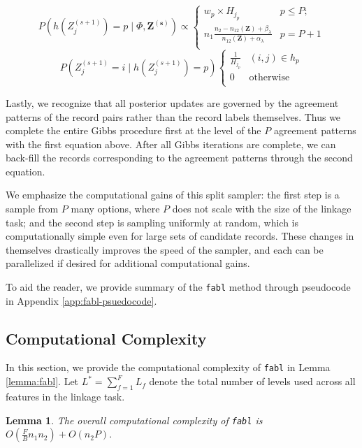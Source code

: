 \documentclass[12pt,letterpaper]{article}
\newcommand{\1}[1]{\mathbb{I}\!\left[#1\right]} %
\newtheorem*{lemma}{Lemma}
\begin{document}
$$P\left(h\left(Z_j^{(s+1)}\right) = p \mid \Phi, \bm{Z^{(s)}}\right) \propto
\begin{cases} 
	w_{p}\times H_{j_p}  & p \leq P; \\
	n_1 \frac{n_2 - n_{12}(\bm{Z}) + \beta_{\lambda}}{n_{12}(\bm{Z}) + \alpha_{\lambda}} &   p = P + 1 \\
\end{cases}$$
$$P\left(Z_j^{(s+1)} = i \mid h\left(Z_j^{(s+1)}\right) = p\right) \begin{cases} 
	\frac{1}{H_{j_p}} & (i, j) \in h_p \\
	0 & \text{otherwise} \\
\end{cases}$$

Lastly, we recognize that all posterior updates are governed by the agreement patterns of the record pairs rather than the record labels themselves. Thus we complete the entire Gibbs procedure first at the level of the \(P\) agreement patterns with the first equation above. After all Gibbs iterations are complete, we can back-fill the records corresponding to the agreement patterns through the second equation.

We emphasize the computational gains of this split sampler: the first step is a sample from $P$ many options, where $P$ does not scale with the size of the linkage task; and the second step is sampling uniformly at random, which is computationally simple even for large sets of candidate records. These changes in themselves drastically improves the speed of the sampler, and each can be parallelized if desired for additional computational gains. 

To aid the reader, we provide summary of the \texttt{fabl} method through pseudocode in Appendix \ref{app:fabl-psuedocode}.

\hypertarget{computational-complexity}{%
	\subsection{Computational Complexity}\label{computational-complexity}}
In this section, we provide the computational complexity of \texttt{fabl} in Lemma \ref{lemma:fabl}. Let $L^{*} = \sum_{f=1}^F L_f$ denote the total number of levels used across all features in the linkage task. 

\begin{lemma}
The overall computational complexity of \texttt{fabl} is $O(\frac{F}{B} n_1 n_2) + O(n_2 P).$
\end{lemma}
\end{document}
